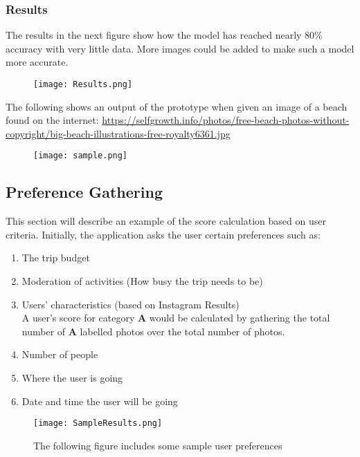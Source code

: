     \subsubsection{Results}
    The results in the next figure show how the model has reached
    nearly 80\% accuracy with very little data. More images could be
    added to make such a model more accurate.

    \begin{figure}[H]
        \centering
        \texttt{[image: Results.png]}
        \label{ModelResults}
    \end{figure}

    The following shows an output of the prototype when given an image
    of a beach found on the internet:
    \url{https://selfgrowth.info/photos/free-beach-photos-without-copyright/big-beach-illustrations-free-royalty6361.jpg}

    \begin{figure}[H]
        \centering
        \texttt{[image: sample.png]}
        \label{oneOutput}
    \end{figure}

\subsection{Preference Gathering}
        This section will describe an example of the score calculation based
        on user criteria. Initially, the application asks the user certain
        preferences such as:
        \begin{enumerate}
            \item The trip budget
            \item Moderation of activities (How busy the trip needs to be)
            \item Users’ characteristics (based on Instagram Results)
            \\ A user’s score for category \textbf{A} would be
            calculated by gathering the total number of \textbf{A}
            labelled photos over the total number of photos. 
            \item Number of people
            \item Where the user is going
            \item Date and time the user will be going
        \end{enumerate}

        \begin{figure}[H]
            \caption{The following figure includes some sample user preferences        }
            \centering
            \texttt{[image: SampleResults.png]}
            \label{dataset}
        \end{figure}


